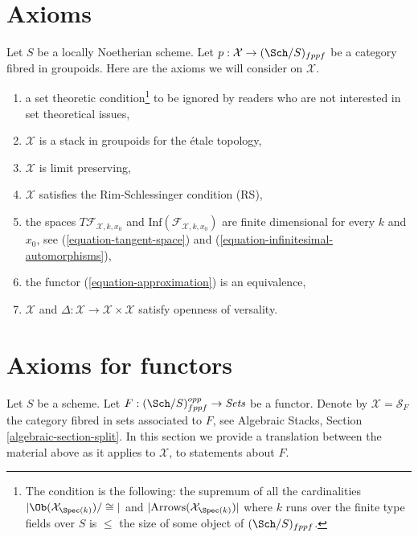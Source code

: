 \section{Axioms}
\label{section-axioms}

\noindent
Let $S$ be a locally Noetherian scheme. Let
$p : \mathcal{X} \to (\Sch/S)_{fppf}$ be a category fibred in groupoids.
Here are the axioms we will consider on $\mathcal{X}$.
\begin{enumerate}
\item[{[-1]}] a set theoretic condition\footnote{The condition is the
following: the supremum of all the cardinalities
$|\Ob(\mathcal{X}_{\Spec(k)})/\cong|$ and
$|\text{Arrows}(\mathcal{X}_{\Spec(k)})|$ where $k$ runs over the finite
type fields over $S$ is $\leq$ the size of some
object of $(\Sch/S)_{fppf}$.} to be ignored by
readers who are not interested in set theoretical issues,
\item[{[0]}] $\mathcal{X}$ is a stack in groupoids for the \'etale topology,
\item[{[1]}] $\mathcal{X}$ is limit preserving,
\item[{[2]}] $\mathcal{X}$ satisfies the Rim-Schlessinger condition (RS),
\item[{[3]}] the spaces $T\mathcal{F}_{\mathcal{X}, k, x_0}$ and
$\text{Inf}(\mathcal{F}_{\mathcal{X}, k, x_0})$
are finite dimensional
for every $k$ and $x_0$, see
(\ref{equation-tangent-space}) and
(\ref{equation-infinitesimal-automorphisms}),
\item[{[4]}] the functor (\ref{equation-approximation}) is an equivalence,
\item[{[5]}] $\mathcal{X}$ and
$\Delta : \mathcal{X} \to \mathcal{X} \times \mathcal{X}$ satisfy
openness of versality.
\end{enumerate}










\section{Axioms for functors}
\label{section-axioms-functors}

\noindent
Let $S$ be a scheme. Let $F : (\Sch/S)_{fppf}^{opp} \to \textit{Sets}$ be a
functor. Denote by $\mathcal{X} = \mathcal{S}_F$ the category fibred in sets
associated to $F$, see Algebraic Stacks, Section \ref{algebraic-section-split}.
In this section we provide a translation between the material above
as it applies to $\mathcal{X}$, to statements about $F$.

